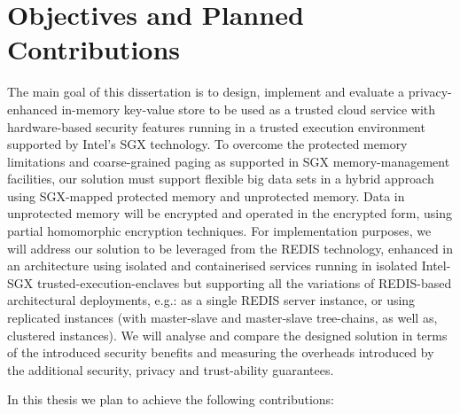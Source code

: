 \section{Objectives and Planned Contributions} %
\label{sec:objectives_and_planned_contributions}

The main goal of this dissertation is to design, implement and evaluate a privacy-enhanced in-memory key-value store to be used as a trusted cloud service with hardware-based security features running in a trusted execution environment supported by Intel’s \gls{SGX} technology. To overcome the protected memory limitations and coarse-grained paging as supported in SGX memory-management facilities, our solution must support flexible big data sets in a hybrid approach using SGX-mapped protected memory and unprotected memory. Data in unprotected memory will be encrypted and operated in the encrypted form, using partial homomorphic encryption techniques.
For implementation purposes, we will address our solution to be leveraged from the REDIS technology, enhanced in an architecture using isolated and containerised services running in isolated Intel-SGX trusted-execution-enclaves but supporting all the variations of REDIS-based architectural deployments, e.g.: as a single REDIS server instance, or using replicated instances (with master-slave and master-slave tree-chains, as well as, clustered instances). We will analyse and compare the designed solution in terms of the introduced security benefits and measuring the overheads introduced by the additional security, privacy and trust-ability guarantees.

In this thesis we plan to achieve the following contributions:

